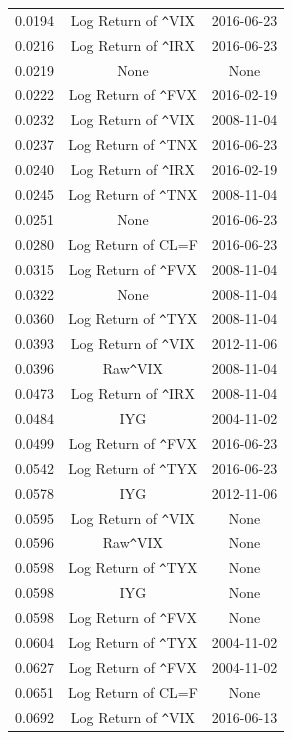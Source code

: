 \documentclass{uiucthesis2021}
\theoremstyle{definition}
\begin{document}
\begin{table}[h]
\begin{tabular}{ccc}
      0.0194 & Log Return of \verb|^|VIX & 2016-06-23 \\ 
      0.0216 & Log Return of \verb|^|IRX & 2016-06-23 \\ 
      \rowcolor{yellow} 0.0219 & None & None \\ 
      0.0222 & Log Return of \verb|^|FVX & 2016-02-19 \\ 
      0.0232 & Log Return of \verb|^|VIX & 2008-11-04 \\ 
      0.0237 & Log Return of \verb|^|TNX & 2016-06-23 \\ 
      0.0240 & Log Return of \verb|^|IRX & 2016-02-19 \\ 
      0.0245 & Log Return of \verb|^|TNX & 2008-11-04 \\ 
      0.0251 & None & 2016-06-23 \\ 
      0.0280 & Log Return of CL=F & 2016-06-23 \\ 
      0.0315 & Log Return of \verb|^|FVX & 2008-11-04 \\ 
      0.0322 & None & 2008-11-04 \\ 
      0.0360 & Log Return of \verb|^|TYX & 2008-11-04 \\ 
      0.0393 & Log Return of \verb|^|VIX & 2012-11-06 \\ 
      0.0396 & Raw\verb|^|VIX & 2008-11-04 \\ 
      0.0473 & Log Return of \verb|^|IRX & 2008-11-04 \\ 
      0.0484 & IYG & 2004-11-02 \\ 
      0.0499 & Log Return of \verb|^|FVX & 2016-06-23 \\ 
      0.0542 & Log Return of \verb|^|TYX & 2016-06-23 \\ 
      0.0578 & IYG & 2012-11-06 \\ 
      0.0595 & Log Return of \verb|^|VIX & None \\ 
      0.0596 & Raw\verb|^|VIX & None \\ 
      0.0598 & Log Return of \verb|^|TYX & None \\ 
      0.0598 & IYG & None \\ 
      0.0598 & Log Return of \verb|^|FVX & None \\ 
      0.0604 & Log Return of \verb|^|TYX & 2004-11-02 \\ 
      0.0627 & Log Return of \verb|^|FVX & 2004-11-02 \\ 
      0.0651 & Log Return of CL=F & None \\ 
      0.0692 & Log Return of \verb|^|VIX & 2016-06-13 \\ 

\end{tabular}
\end{table}
\end{document}
